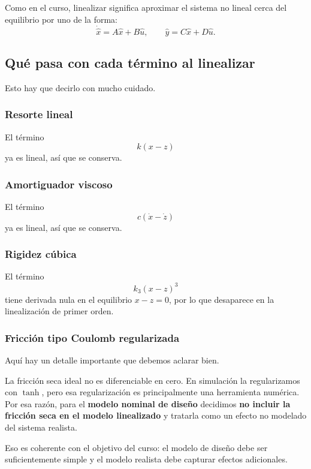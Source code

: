 \documentclass[11pt]{article}
\begin{document}
Como en el curso, linealizar significa aproximar el sistema no lineal cerca del equilibrio por uno de la forma:
\begin{equation}
\dot{\hat{x}} = A\hat{x}+B\hat{u},
\qquad
\hat{y}=C\hat{x}+D\hat{u}.
\end{equation}

\subsection{Qu\'e pasa con cada t\'ermino al linealizar}

Esto hay que decirlo con mucho cuidado.

\subsubsection{Resorte lineal}

El t\'ermino
\[
k(x-z)
\]
ya es lineal, as\'i que se conserva.

\subsubsection{Amortiguador viscoso}

El t\'ermino
\[
c(\dot{x}-\dot{z})
\]
ya es lineal, as\'i que se conserva.

\subsubsection{Rigidez c\'ubica}

El t\'ermino
\[
k_3(x-z)^3
\]
tiene derivada nula en el equilibrio $x-z=0$, por lo que desaparece en la linealizaci\'on de primer orden.

\subsubsection{Fricci\'on tipo Coulomb regularizada}

Aqu\'i hay un detalle importante que debemos aclarar bien.

La fricci\'on seca ideal no es diferenciable en cero. En simulaci\'on la regularizamos con $\tanh$, pero esa regularizaci\'on es principalmente una herramienta num\'erica. Por esa raz\'on, para el \textbf{modelo nominal de dise\~no} decidimos \textbf{no incluir la fricci\'on seca en el modelo linealizado} y tratarla como un efecto no modelado del sistema realista.

Eso es coherente con el objetivo del curso: el modelo de dise\~no debe ser suficientemente simple y el modelo realista debe capturar efectos adicionales.
\end{document}
